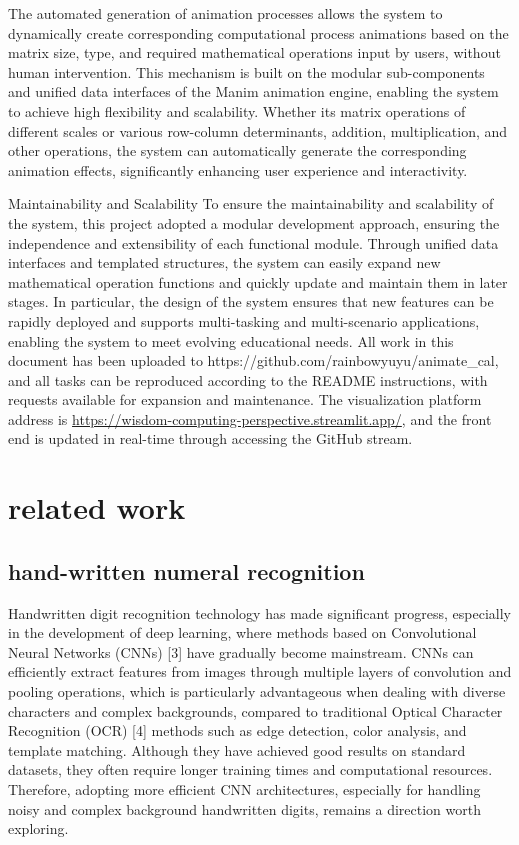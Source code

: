 \documentclass[
]{article}
\begin{document}
The automated generation of animation processes allows the system to
dynamically create corresponding computational process animations based
on the matrix size, type, and required mathematical operations input by
users, without human intervention. This mechanism is built on the
modular sub-components and unified data interfaces of the Manim
animation engine, enabling the system to achieve high flexibility and
scalability. Whether it\textquotesingle s matrix operations of different
scales or various row-column determinants, addition, multiplication, and
other operations, the system can automatically generate the
corresponding animation effects, significantly enhancing user experience
and interactivity.

Maintainability and Scalability To ensure the maintainability and
scalability of the system, this project adopted a modular development
approach, ensuring the independence and extensibility of each functional
module. Through unified data interfaces and templated structures, the
system can easily expand new mathematical operation functions and
quickly update and maintain them in later stages. In particular, the
design of the system ensures that new features can be rapidly deployed
and supports multi-tasking and multi-scenario applications, enabling the
system to meet evolving educational needs. All work in this document has
been uploaded to https://github.com/rainbowyuyu/animate\_cal, and all
tasks can be reproduced according to the README instructions, with
requests available for expansion and maintenance. The visualization
platform address is
\url{https://wisdom-computing-perspective.streamlit.app/}, and the front
end is updated in real-time through accessing the GitHub stream.

\section{related work}\label{related-work}

\subsection{hand-written numeral
recognition}\label{hand-written-numeral-recognition}

Handwritten digit recognition technology has made significant progress,
especially in the development of deep learning, where methods based on
Convolutional Neural Networks (CNNs) {[}3{]} have gradually become
mainstream. CNNs can efficiently extract features from images through
multiple layers of convolution and pooling operations, which is
particularly advantageous when dealing with diverse characters and
complex backgrounds, compared to traditional Optical Character
Recognition (OCR) {[}4{]} methods such as edge detection, color
analysis, and template matching. Although they have achieved good
results on standard datasets, they often require longer training times
and computational resources. Therefore, adopting more efficient CNN
architectures, especially for handling noisy and complex background
handwritten digits, remains a direction worth exploring.
\end{document}
